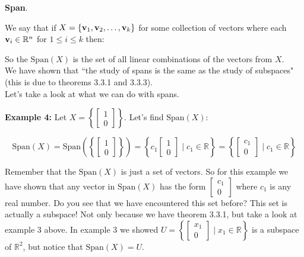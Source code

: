 \documentclass[12pt]{article}
\newcommand*\mybluebox[1]{%
\colorbox{myblue}{\hspace{1em}#1\hspace{1em}}}
\begin{document}
\begin{center}{\LARGE \bf Span}.\end{center}

We say that if $X=\{{\bf v}_1,{\bf v}_2,\ldots,{\bf v}_k \}$ for some collection of vectors where each ${\bf v}_i \in \mathbb{R}^n$ for $1\leq i \leq k$ then:


So the $\text{Span}(X)$ is the set of all linear combinations of the vectors from $X$.\\

We have shown that ``the study of spans is the same as the study of subspaces" (this is due to theorems 3.3.1 and 3.3.3).\\

Let's take a look at what we can do with spans.  

{\bf Example 4:}  Let $X = \left\{ \left[ \begin{array}{c} 1  \\ 0  \end{array} \right] \right\}$.  Let's find $(X)$:


\[ \text{Span}(X)= \text{Span} \left( \left \{ \left[ \begin{array}{c} 1  \\ 0  \end{array} \right] \right\} \right) =\left \{c_1 \left[ \begin{array}{c} 1  \\ 0  \end{array} \right] \mid c_1 \in \mathbb{R} \right\} =  \left \{\left[ \begin{array}{c} c_1   \\ 0  \end{array} \right] \mid c_1 \in \mathbb{R} \right\} \]

Remember that the $(X)$ is just a set of vectors.  So for this example we have shown that any vector in $(X)$ has the form $\left[ \begin{array}{c} c_1   \\ 0  \end{array} \right]$ where $c_1$ is any real number.  Do you see that we have encountered this set before?  This set is actually a subspace!  Not only because we have theorem 3.3.1, but take a look at example 3 above.  In example 3 we showed $U=\left \{ \left[ \begin{array}{c} x_1  \\ 0  \end{array} \right] \mid x_1 \in {} \right \}$ is a subspace of $^2$, but notice that $(X)=U$.\\
\end{document}
